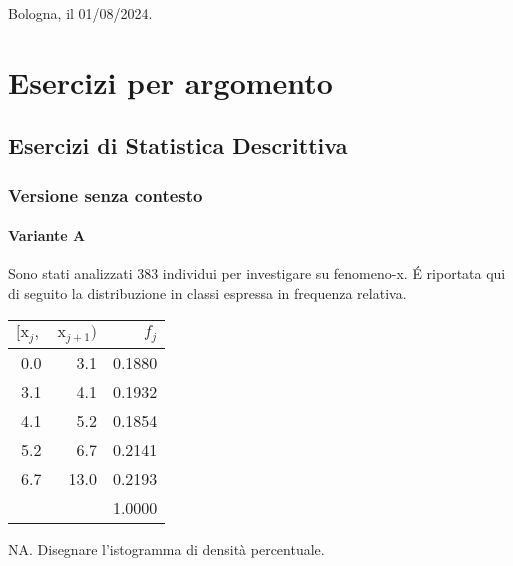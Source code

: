 \documentclass[
  11pt,
]{book}
\theoremstyle{mytheoremstyle}
\theoremstyle{mydefstyle}
\begin{document}
Bologna, il 01/08/2024.

\part{Esercizi per argomento}

\chapter{Esercizi di Statistica Descrittiva}\label{esercizi-di-statistica-descrittiva}

\section{Versione senza contesto}\label{versione-senza-contesto}

\subsection{Variante A}\label{variante-a}

Sono stati analizzati 383 individui per investigare su fenomeno-x. É riportata qui di seguito la distribuzione in classi espressa in frequenza relativa.

\begin{tabular}{rrr}
\toprule
$[\text{x}_j,$ & $\text{x}_{j+1})$ & $f_j$\\
\midrule
0.0 & 3.1 & 0.1880\\
3.1 & 4.1 & 0.1932\\
4.1 & 5.2 & 0.1854\\
5.2 & 6.7 & 0.2141\\
6.7 & 13.0 & 0.2193\\
 &  & 1.0000\\
\bottomrule
\end{tabular}

NA. Disegnare l'istogramma di densità percentuale.
\end{document}
